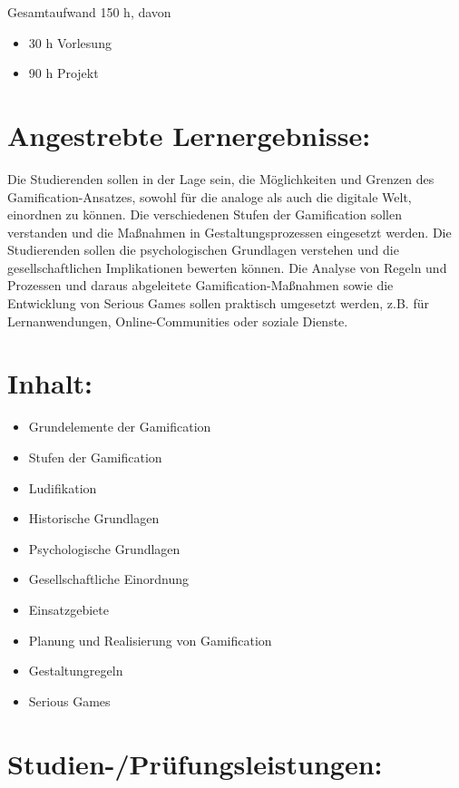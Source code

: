 Gesamtaufwand 150 h, davon

\begin{itemize}
\tightlist
\item
  30 h Vorlesung
\item
  90 h Projekt
\end{itemize}

\section{Angestrebte
Lernergebnisse:}\label{angestrebte-lernergebnisse-23}

Die Studierenden sollen in der Lage sein, die Möglichkeiten und Grenzen
des Gamification-Ansatzes, sowohl für die analoge als auch die digitale
Welt, einordnen zu können. Die verschiedenen Stufen der Gamification
sollen verstanden und die Maßnahmen in Gestaltungsprozessen eingesetzt
werden. Die Studierenden sollen die psychologischen Grundlagen verstehen
und die gesellschaftlichen Implikationen bewerten können. Die Analyse
von Regeln und Prozessen und daraus abgeleitete Gamification-Maßnahmen
sowie die Entwicklung von Serious Games sollen praktisch umgesetzt
werden, z.B. für Lernanwendungen, Online-Communities oder soziale
Dienste.

\section{Inhalt:}\label{inhalt-23}

\begin{itemize}
\tightlist
\item
  Grundelemente der Gamification
\item
  Stufen der Gamification
\item
  Ludifikation
\item
  Historische Grundlagen
\item
  Psychologische Grundlagen
\item
  Gesellschaftliche Einordnung
\item
  Einsatzgebiete
\item
  Planung und Realisierung von Gamification
\item
  Gestaltungregeln
\item
  Serious Games
\end{itemize}

\section{Studien-/Prüfungsleistungen:}\label{studien-pruxfcfungsleistungen-23}

